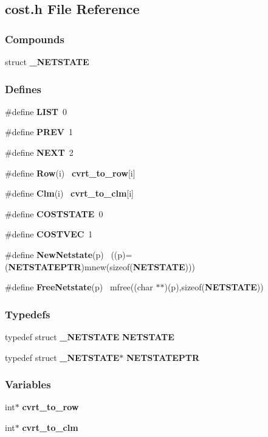 \subsection{cost.h File Reference}
\label{cost.h}
\subsubsection*{Compounds}
\begin{CompactItemize}
\item 
struct {\bf \_\-NETSTATE}
\end{CompactItemize}
\subsubsection*{Defines}
\begin{CompactItemize}
\item 
\#define {\bf LIST}\ 0
\item 
\#define {\bf PREV}\ 1
\item 
\#define {\bf NEXT}\ 2
\item 
\#define {\bf Row}(i) \ {\bf cvrt\_\-to\_\-row}[i]
\item 
\#define {\bf Clm}(i) \ {\bf cvrt\_\-to\_\-clm}[i]
\item 
\#define {\bf COSTSTATE}\ 0
\item 
\#define {\bf COSTVEC}\ 1
\item 
\#define {\bf New\-Netstate}(p) \ ((p)=({\bf NETSTATEPTR})mnew(sizeof({\bf NETSTATE})))
\item 
\#define {\bf Free\-Netstate}(p) \ mfree((char $\ast$$\ast$)(p),sizeof({\bf NETSTATE}))
\end{CompactItemize}
\subsubsection*{Typedefs}
\begin{CompactItemize}
\item 
typedef struct {\bf \_\-NETSTATE}
 {\bf NETSTATE}
\item 
typedef struct {\bf \_\-NETSTATE}$\ast$ {\bf NETSTATEPTR}
\end{CompactItemize}
\subsubsection*{Variables}
\begin{CompactItemize}
\item 
int$\ast$ {\bf cvrt\_\-to\_\-row}
\item 
int$\ast$ {\bf cvrt\_\-to\_\-clm}
\end{CompactItemize}


